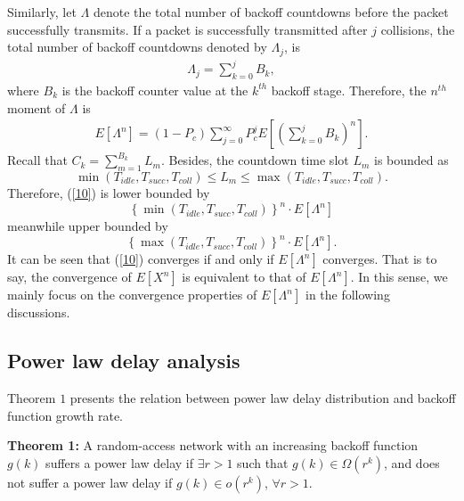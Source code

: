 \documentclass[journal]{IEEEtran}
\begin{document}
Similarly, let $\Lambda$ denote the total number of backoff countdowns before the packet successfully transmits. If a packet is successfully transmitted after $j$ collisions, the total number of backoff countdowns denoted by $\Lambda_j$, is
\begin{equation}
\begin{aligned}
\Lambda_j = \sum_{k=0}^j B_k,
\end{aligned}
\end{equation}
where $B_k$ is the backoff counter value at the $k^{th}$ backoff stage. Therefore, the $n^{th}$ moment of $\Lambda$ is
\begin{equation}
\label{11}
\begin{aligned}
E\left[\Lambda^n\right]=(1-P_c)\sum_{j=0}^{\infty}P_c^j E\left[\left(\sum_{k=0}^j B_k\right)^n\right].
\end{aligned}
\end{equation}
Recall that $ C_k=\sum_{m=1}^{B_k}L_m$. Besides, the countdown time slot $L_m$ is bounded as
\begin{equation*}
\min\left(T_{idle}, T_{succ},T_{coll}\right)\leq L_m \leq \max\left(T_{idle}, T_{succ},T_{coll}\right).
\end{equation*}
Therefore, (\ref{10}) is lower bounded by
\begin{equation}
\label{16}
\left\{\min\left(T_{idle}, T_{succ},T_{coll}\right)\right\}^n\cdot E\left[\Lambda^n\right]
\end{equation}
meanwhile upper bounded by
\begin{equation}
\left\{\max\left(T_{idle}, T_{succ},T_{coll}\right)\right\}^n\cdot E\left[\Lambda^n\right].
\end{equation}
It can be seen that (\ref{10}) converges if and only if $E\left[\Lambda^n\right]$ converges. That is to say, the convergence of $E\left[X^n\right]$ is equivalent to that of $E\left[\Lambda^n\right]$. In this sense, we mainly focus on the convergence properties of $E\left[\Lambda^n\right]$ in the following discussions.

\subsection{Power law delay analysis}
Theorem $1$ presents the relation between power law delay distribution and backoff function growth rate.

\textbf{Theorem 1:} A random-access network with an increasing backoff function $g(k)$ suffers a power law delay if $\exists r>1$ such that $g(k)\in\Omega(r^k)$, and does not suffer a power law delay if $g(k)\in o\left(r^k\right)$, $\forall r>1$.
\end{document}
